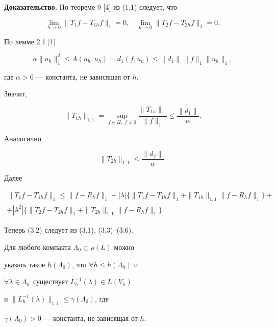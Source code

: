 {\bf Доказательство.} По теореме 9 [4] из (1.1) следует, что


\begin{equation}


\lim_{h\to 0}\|T_1 f-T_{1h}f\|_1=0,\quad\lim_{h\to 0}\|T_2 f-T_{2h}f\|_1=0.


\end{equation}


По лемме 2.1 [1]


$$


\alpha \|u_h\|_1^2\le A(u_h,u_h)=d_1(f,u_h)\le \|d_1\|\, \|f\|_1 \|u_h\|_1,


$$


где $\alpha >0$ --- константа, не зависящая от $h$.





Значит,


\begin{equation}


\|T_{1h}\|_{1,1}=\sup_{f\in H,\;f\neq 0}\frac{\|T_{1h}\|_1}{\|f\|_1}


\le \frac{\|d_1\|}{\alpha}.


\end{equation}


Аналогично


\begin{equation}


\|T_{2h}\|_{1,1}\le \frac{\|d_2\|}{\alpha}.


\end{equation}


Далее


\begin{multline}


\|T_1 f-T_{1h}f\|_1\le \|f-R_h f\|_1+|\lambda|\{\|T_1 f-T_{1h}f\|_1+


\|T_{1h}\|_{1,1}\|f-R_h f\|_1\}+\\


%


+|\lambda^2|\{\|T_2 f-T_{2h}f\|_1+\|T_{2h}\|_{1,1}\|f-R_h f\|_1\}.


\end{multline}


Теперь (3.2) следует из (3.1), (3.3)--(3.6).





\begin{lems} Для любого компакта $\Lambda_0\subset \rho(L)$ можно


указать такое $h(\Lambda_0)$, что $\forall h\le h(\Lambda_0)$ и


$\forall \lambda\in \Lambda_0$\ существует $L_h^{-1}(\lambda)\in L(V_h)$


 и $\|L_h^{-1}(\lambda)\|_{1,1}\le \gamma(\Lambda_0)$, где


$\gamma(\Lambda_0)>0$ --- константа, не зависящая от $h$.


\end{lems}





